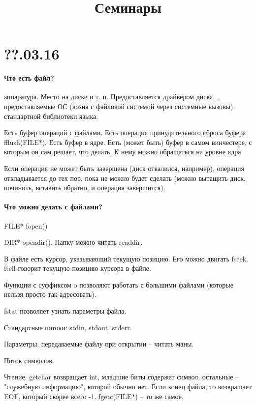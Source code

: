 \documentclass[a4paper,10pt]{article}
\title{\textbf{Семинары}}
\begin{document}
\maketitle

\section{??.03.16}

\paragraph{Что есть файл?}

\begin{enumerate}
 аппаратура. Место на диске и т. п. Предоставляется драйвером диска.
, предоставляемые ОС (возня с файловой системой через системные вызовы).
 стандартной библиотеки языка.
\end{enumerate}
Есть буфер операций с файлами. Есть операция принудительного сброса буфера fflush(FILE*). Есть буфер в ядре. Есть (может быть) буфер в самом винчестере, с которым он сам решает, что делать. К нему можно обращаться на уровне ядра.

Если операция не может быть завершена (диск отвалился, например), операция откладывается до тех пор, пока не можно будет сделать (можно вытащить диск, починить, вставить обратно, и операция завершится).


\paragraph{Что можно делать с файлами?}

FILE* fopen()

DIR* opendir(). Папку можно читать readdir.

В файле есть курсор, указывающий текущую позицию. Его можно двигать fseek. ftell говорит текущую позицию курсора в файле.

Функции с суффиксом o позволяют работать с большими файлами (которые нельзя просто так адресовать).

fstat позволяет узнать параметры файла.

Стандартные потоки: stdin, stdout, stderr.

Параметры, передаваемые файлу при открытии -- читать маны.

Поток символов.

Чтение. getchar возвращает int, младшие биты содержат символ, остальные -- "служебную информацию", которой обычно нет. Если конец файла, то возвращает EOF, который скорее всего -1. fgetc(FILE*) -- то же самое.
\end{document}
